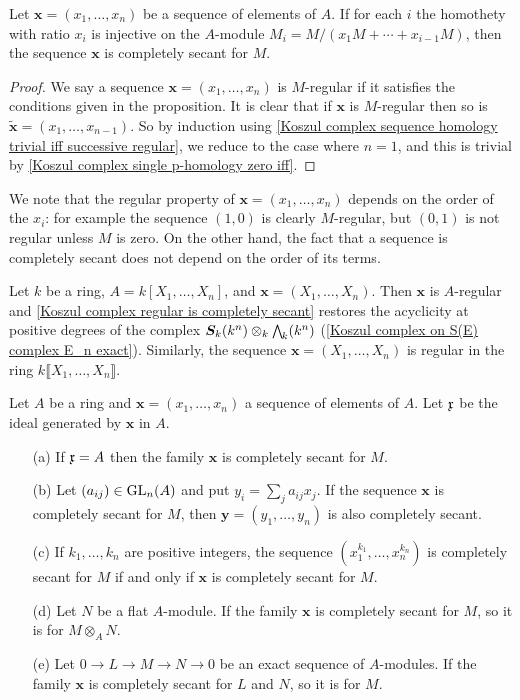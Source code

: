 \begin{proposition}\label{Koszul complex regular is completely secant}
Let $\bm{x}=(x_1,\dots,x_n)$ be a sequence of elements of $A$. If for each $i$ the homothety with ratio $x_i$ is injective on the $A$-module $M_i=M/(x_1M+\cdots+x_{i-1}M)$, then the sequence $\bm{x}$ is completely secant for $M$.
\end{proposition}
\begin{proof}
We say a sequence $\bm{x}=(x_1,\dots,x_n)$ is $M$-regular if it satisfies the conditions given in the proposition. It is clear that if $\bm{x}$ is $M$-regular then so is $\tilde{\bm{x}}=(x_1,\dots,x_{n-1})$. So by induction using \cref{Koszul complex sequence homology trivial iff successive regular}, we reduce to the case where $n=1$, and this is trivial by \cref{Koszul complex single p-homology zero iff}.
\end{proof}
We note that the regular property of $\bm{x}=(x_1,\dots,x_n)$ depends on the order of the $x_i$: for example the sequence $(1,0)$ is clearly $M$-regular, but $(0,1)$ is not regular unless $M$ is zero. On the other hand, the fact that a sequence is completely secant does not depend on the order of its terms.
\begin{example}
Let $k$ be a ring, $A=k[X_1,\dots,X_n]$, and $\bm{x}=(X_1,\dots,X_n)$. Then $\bm{x}$ is $A$-regular and \cref{Koszul complex regular is completely secant} restores the acyclicity at positive degrees of the complex $\bm{S}_k(k^n)\otimes_k\bigw_k(k^n)$ (\cref{Koszul complex on S(E) complex E_n exact}). Similarly, the sequence $\bm{x}=(X_1,\dots,X_n)$ is regular in the ring $k\llbracket X_1,\dots,X_n\rrbracket$.
\end{example}
\begin{proposition}\label{Koszul complex completely secant prop}
Let $A$ be a ring and $\bm{x}=(x_1,\dots,x_n)$ a sequence of elements of $A$. Let $\mathfrak{x}$ be the ideal generated by $\bm{x}$ in $A$.
\begin{itemize}
\item[(a)] If $\mathfrak{x}=A$ then the family $\bm{x}$ is completely secant for $M$.
\item[(b)] Let $(a_{ij})\in\mathrm{GL}_n(A)$ and put $y_i=\sum_ja_{ij}x_j$. If the sequence $\bm{x}$ is completely secant for $M$, then $\bm{y}=(y_1,\dots,y_n)$ is also completely secant.
\item[(c)] If $k_1,\dots,k_n$ are positive integers, the sequence $(x_1^{k_1},\dots,x_n^{k_n})$ is completely secant for $M$ if and only if $\bm{x}$ is completely secant for $M$.
\item[(d)] Let $N$ be a flat $A$-module. If the family $\bm{x}$ is completely secant for $M$, so it is for $M\otimes_AN$.
\item[(e)] Let $0\to L\to M\to N\to 0$ be an exact sequence of $A$-modules. If the family $\bm{x}$ is completely secant for $L$ and $N$, so it is for $M$.
\end{itemize}
\end{proposition}
